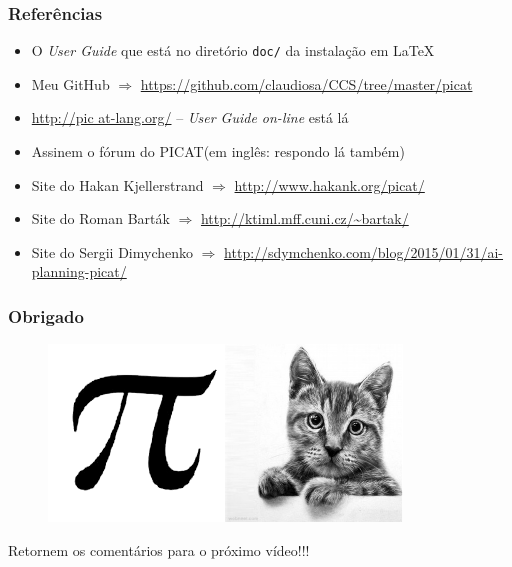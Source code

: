 \documentclass[10pt]{beamer}
\begin{document}

\begin{frame}
    \frametitle{Referências}
    \begin{itemize}
    \item O \textit{User Guide} que está no diretório  \texttt{doc/} da instalação em \LaTeX
    
     \item Meu GitHub $\Rightarrow $  \url{https://github.com/claudiosa/CCS/tree/master/picat}

     \item \url{http://pic at-lang.org/} -- \textit{User Guide on-line} está lá
    
    \item Assinem o fórum do PICAT(em inglês: respondo lá também)

    \item Site do Hakan  Kjellerstrand  $\Rightarrow $ \url{http://www.hakank.org/picat/}
    \item Site do Roman Barták  $\Rightarrow $ 	\url{http://ktiml.mff.cuni.cz/~bartak/}
    \item Site do Sergii Dimychenko  $\Rightarrow $ \url{http://sdymchenko.com/blog/2015/01/31/ai-planning-picat/}
    
    \end{itemize}
\end{frame}


\begin{frame}
    \frametitle{Obrigado}

\begin{figure}[!ht]
\centering
\includegraphics[height=0.45\textheight]{figures/meu_logo_picat.pdf}
\end{figure}
 Retornem os comentários para o próximo vídeo!!!


\end{frame}
\end{document}
